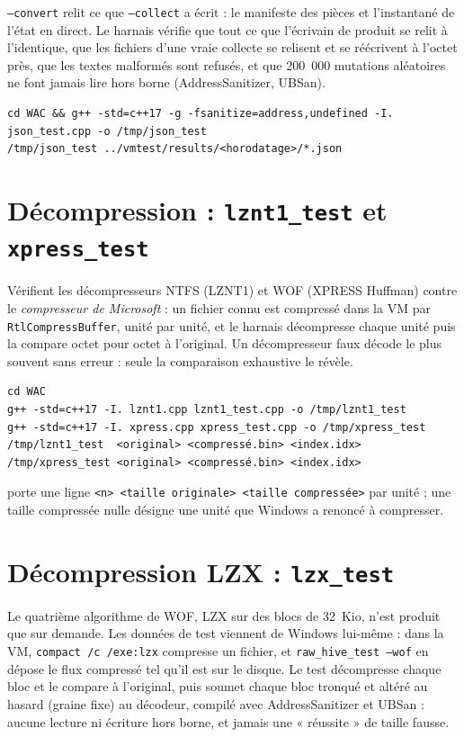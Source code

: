 \documentclass[11pt,a4paper,oneside]{report}
\begin{document}
\texttt{--convert} relit ce que \texttt{--collect} a écrit : le manifeste des
pièces et l'instantané de l'état en direct. Le harnais vérifie que tout ce que
l'écrivain de \wac{} produit se relit à l'identique, que les fichiers d'une
vraie collecte se relisent et se réécrivent à l'octet près, que les textes
malformés sont refusés, et que 200~000 mutations aléatoires ne font jamais lire
hors borne (AddressSanitizer, UBSan).

\begin{lstlisting}
cd WAC && g++ -std=c++17 -g -fsanitize=address,undefined -I. json_test.cpp -o /tmp/json_test
/tmp/json_test ../vmtest/results/<horodatage>/*.json
\end{lstlisting}

\section{Décompression : \texttt{lznt1\_test} et \texttt{xpress\_test}}

Vérifient les décompresseurs NTFS (LZNT1) et WOF (XPRESS Huffman) contre le
\emph{compresseur de Microsoft} : un fichier connu est compressé dans la VM par
\texttt{RtlCompressBuffer}, unité par unité, et le harnais décompresse chaque
unité puis la compare octet pour octet à l'original. Un décompresseur faux
décode le plus souvent sans erreur : seule la comparaison exhaustive le révèle.

\begin{lstlisting}
cd WAC
g++ -std=c++17 -I. lznt1.cpp lznt1_test.cpp -o /tmp/lznt1_test
g++ -std=c++17 -I. xpress.cpp xpress_test.cpp -o /tmp/xpress_test
/tmp/lznt1_test  <original> <compressé.bin> <index.idx>
/tmp/xpress_test <original> <compressé.bin> <index.idx>
\end{lstlisting}

 porte une ligne \texttt{<n> <taille originale> <taille
compressée>} par unité ; une taille compressée nulle désigne une unité que
Windows a renoncé à compresser.

\section{Décompression LZX : \texttt{lzx\_test}}

Le quatrième algorithme de WOF, LZX sur des blocs de 32~Kio, n'est produit que
sur demande. Les données de test viennent de Windows lui-même : dans la VM,
\texttt{compact /c /exe:lzx} compresse un fichier, et
\texttt{raw\_hive\_test --wof} en dépose le flux compressé tel qu'il est sur le
disque. Le test décompresse chaque bloc et le compare à l'original, puis soumet
chaque bloc tronqué et altéré au hasard (graine fixe) au décodeur, compilé avec
AddressSanitizer et UBSan : aucune lecture ni écriture hors borne, et jamais une
« réussite » de taille fausse.
\end{document}
